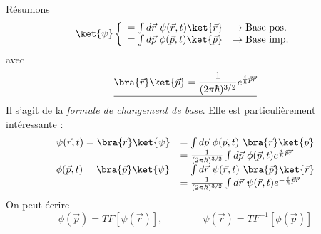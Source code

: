 		Résumons
		\begin{equation}
		\ket{\psi}\left\{\begin{array}{ll}
		= \int d\vec{r}\ \psi(\vec{r},t)\ket{\vec{r}} & \rightarrow\text{Base pos.}\\
		= \int d\vec{p}\ \phi(\vec{p},t)\ket{\vec{p}} & \rightarrow\text{Base imp.}		
		\end{array}\right.
		\end{equation}
		avec
		\begin{equation}
		\underline{\bra{\vec{r}}\ket{\vec{p}} = \frac{1}{(2\pi\hbar)^{3/2}}e^{\frac{i}{\hbar}\vec{p}\vec{r}}}
		\end{equation}
		Il s'agit de la \textit{formule de changement de base}. Elle est particulièrement intéressante :
		\begin{equation}
		\begin{array}{ll}
		\psi(\vec{r},t) = \bra{\vec{r}}\ket{\psi} &= \int d\vec{p}\ \phi(\vec{p},t)\ \bra{\vec{r}}\ket{\vec{p}}\\
		&= \frac{1}{(2\pi\hbar)^{3/2}}\int d\vec{p}\ \phi(\vec{p},t)e^{\frac{i}{\hbar}\vec{p}\vec{r}}\\
		\phi(\vec{p},t) = \bra{\vec{p}}\ket{\psi} &= \int d\vec{r}\ \psi(\vec{r},t)\ \bra{\vec{p}}\ket{\vec{r}}\\
		&= \frac{1}{(2\pi\hbar)^{3/2}}\int d\vec{r}\ \psi(\vec{r},t)e^{-\frac{i}{\hbar}\vec{p}\vec{r}}		
		\end{array}
		\end{equation}
		On peut écrire
		\begin{equation}
		\underline{\phi(\vec p) = TF[\psi(\vec{r})]},\qquad\qquad \underline{\psi(\vec r) = TF^{-1}
		[\phi(\vec{p})]}
		\end{equation}
		
